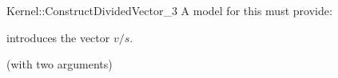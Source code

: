 \begin{ccRefFunctionObjectConcept}{Kernel::ConstructDividedVector_3}
A model for this must provide:


            {introduces the vector $v/s$.}


\ccRefines
{} (with two arguments)

\ccSeeAlso
{}\\

\end{ccRefFunctionObjectConcept}
